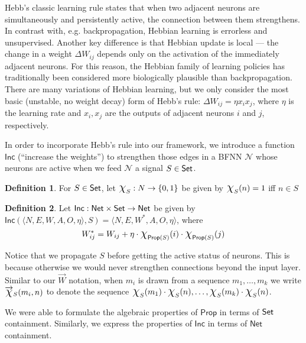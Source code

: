 \documentclass[letterpaper]{article}
\theoremstyle{definition}
\newtheorem{definition}{Definition}
\newcommand{\Set}{\mbox{\sf Set}}
\newcommand{\set}[1]{\{ #1 \}}
\newcommand*{\bigchi}{\mbox{\Large$\chi$}}%
\newcommand{\Prop}{\textsf{Prop}}
\newcommand{\Inc}{\textsf{Inc}}
\newcommand{\AllNets}{\mathsf{Net}}
\newcommand{\Net}{\mathcal{N}}
\begin{document}
Hebb's classic learning rule \citep{hebb-organization-of-behavior-1949} states that when two adjacent neurons are simultaneously and persistently active, the connection between them strengthens.  In contrast with, e.g. backpropagation, Hebbian learning is errorless and unsupervised.  Another key difference is that Hebbian update is local --- the change in a weight $\Delta W_{ij}$ depends only on the activation of the immediately adjacent neurons.  For this reason, the Hebbian family of learning policies has traditionally been considered more biologically plausible than backpropagation.  There are many variations of Hebbian learning, but we only consider the most basic (unstable, no weight decay) form of Hebb's rule:  $\Delta W_{ij} = \eta x_i x_j$, where $\eta$ is the learning rate and $x_i, x_j$ are the outputs of adjacent neurons $i$ and $j$, respectively.

In order to incorporate Hebb's rule into our framework, we introduce a function $\Inc$ (``increase the weights'') to strengthen those edges in a BFNN $\Net$ whose neurons are active when we feed $\Net$ a signal $S \in \Set$.  
\begin{definition}
For $S \in \Set$, let 
$\bigchi_S : N \to \set{0, 1}$ be given by $\bigchi_S(n) = 1$ iff $n \in S$
\end{definition}

\begin{definition}
\label{def:inc}
Let ${\Inc : \AllNets \times \Set \to \AllNets}$ be given by $\Inc(\langle N, E, W, A, O, \eta \rangle, S) = \langle N, E, W^\ast, A, O, \eta \rangle$, where
\[
    W_{ij}^\ast = W_{ij} + \eta \cdot \bigchi_{\Prop(S)}(i) \cdot  \bigchi_{\Prop(S)}(j)
\]
\end{definition}
Notice that we propagate $S$ before getting the active status of neurons.  This is because otherwise we would never strengthen connections beyond the input layer.  Similar to our $\overrightarrow{W}$ notation, when $m_i$ is drawn from a sequence ${m_1, \ldots, m_k}$ we write $\overrightarrow{\bigchi}_S(m_i, n)$ to denote the sequence $\bigchi_S(m_1) \cdot \bigchi_S(n), \ldots, \bigchi_S(m_k) \cdot \bigchi_S(n)$.

We were able to formulate the algebraic properties of $\Prop$ in terms of $\Set$ containment.  Similarly, we express the properties of $\Inc$ in terms of $\AllNets$ containment.  
\end{document}
